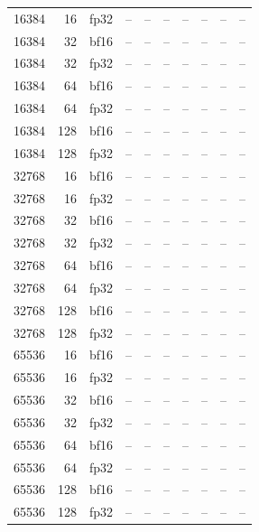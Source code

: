 \begin{table}[H]
{\begin{tabular}{@{}rrlrrrrrrr@{}}
16384 & 16 & fp32 & -- & -- & -- & -- & -- & -- & -- \\
16384 & 32 & bf16 & -- & -- & -- & -- & -- & -- & -- \\
16384 & 32 & fp32 & -- & -- & -- & -- & -- & -- & -- \\
16384 & 64 & bf16 & -- & -- & -- & -- & -- & -- & -- \\
16384 & 64 & fp32 & -- & -- & -- & -- & -- & -- & -- \\
16384 & 128 & bf16 & -- & -- & -- & -- & -- & -- & -- \\
16384 & 128 & fp32 & -- & -- & -- & -- & -- & -- & -- \\
32768 & 16 & bf16 & -- & -- & -- & -- & -- & -- & -- \\
32768 & 16 & fp32 & -- & -- & -- & -- & -- & -- & -- \\
32768 & 32 & bf16 & -- & -- & -- & -- & -- & -- & -- \\
32768 & 32 & fp32 & -- & -- & -- & -- & -- & -- & -- \\
32768 & 64 & bf16 & -- & -- & -- & -- & -- & -- & -- \\
32768 & 64 & fp32 & -- & -- & -- & -- & -- & -- & -- \\
32768 & 128 & bf16 & -- & -- & -- & -- & -- & -- & -- \\
32768 & 128 & fp32 & -- & -- & -- & -- & -- & -- & -- \\
65536 & 16 & bf16 & -- & -- & -- & -- & -- & -- & -- \\
65536 & 16 & fp32 & -- & -- & -- & -- & -- & -- & -- \\
65536 & 32 & bf16 & -- & -- & -- & -- & -- & -- & -- \\
65536 & 32 & fp32 & -- & -- & -- & -- & -- & -- & -- \\
65536 & 64 & bf16 & -- & -- & -- & -- & -- & -- & -- \\
65536 & 64 & fp32 & -- & -- & -- & -- & -- & -- & -- \\
65536 & 128 & bf16 & -- & -- & -- & -- & -- & -- & -- \\
65536 & 128 & fp32 & -- & -- & -- & -- & -- & -- & -- \\
\bottomrule
\end{tabular}
}
\end{table}
